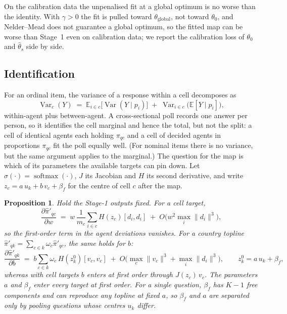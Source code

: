 \documentclass[11pt]{article}
\DeclareMathOperator{\softmax}{softmax}
\newtheorem{proposition}{Proposition}
\begin{document}
On the calibration data the unpenalised fit at a global optimum is no worse than the identity. With $\gamma>0$ the fit is pulled toward $\theta_{\text{global}}$, not toward $\theta_0$, and Nelder--Mead does not guarantee a global optimum, so the fitted map can be worse than Stage~1 even on calibration data; we report the calibration loss of $\theta_0$ and $\hat\theta_s$ side by side.

\subsection{Identification}
\label{sec:ident}
For an ordinal item, the variance of a response within a cell decomposes as
\begin{equation}
\operatorname{Var}_c(Y) \;=\; \mathbb{E}_{i\in c}\big[\operatorname{Var}(Y\mid p_i)\big] \;+\; \operatorname{Var}_{i\in c}\big(\mathbb{E}[Y\mid p_i]\big),
\end{equation}
within-agent plus between-agent. A cross-sectional poll records one answer per person, so it identifies the cell marginal and hence the total, but not the split: a cell of identical agents each holding $\pi_{qc}$ and a cell of decided agents in proportions $\pi_{qc}$ fit the poll equally well. (For nominal items there is no variance, but the same argument applies to the marginal.) The question for the map is which of its parameters the available targets can pin down. Let $\sigma(\cdot)=\softmax(\cdot)$, $J$ its Jacobian and $H$ its second derivative, and write $z_c = a\,u_k + b\,v_c + \beta_f$ for the centre of cell $c$ after the map.

\begin{proposition}
\label{prop:ident}
Hold the Stage-1 outputs fixed. For a cell target,
\[
\frac{\partial \hat\pi'_{qc}}{\partial w} \;=\; w\,\frac{1}{m_c}\sum_{i\in c} H(z_c)[d_i,d_i] \;+\; O\big(w^2\max_i\lVert d_i\rVert^3\big),
\]
so the first-order term in the agent deviations vanishes. For a country topline $\hat\pi'_{qk}=\sum_{c\in k}\omega_c\hat\pi'_{qc}$, the same holds for $b$:
\[
\frac{\partial \hat\pi'_{qk}}{\partial b} \;=\; b\sum_{c\in k}\omega_c\, H(z^0_k)[v_c,v_c] \;+\; O\big(\max_c\lVert v_c\rVert^3 + \max_i\lVert d_i\rVert^3\big),\qquad z^0_k = a\,u_k+\beta_f,
\]
whereas with cell targets $b$ enters at first order through $J(z_c)\,v_c$. The parameters $a$ and $\beta_f$ enter every target at first order. For a single question, $\beta_f$ has $K-1$ free components and can reproduce any topline at fixed $a$, so $\beta_f$ and $a$ are separated only by pooling questions whose centres $u_k$ differ.
\end{proposition}
\end{document}
